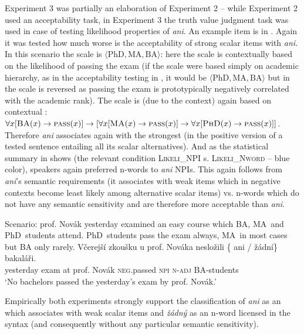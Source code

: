 \documentclass[output=paper, colorlinks, citecolor=brown, newtxmath]{langsci/langscibook}
\begin{document}
Experiment 3 was partially an elaboration of Experiment 2 -- while Experiment 2 used an acceptability task, in Experiment 3 the truth value judgment task was used in case of testing likelihood properties of \textit{ani}. An example item is in . Again it was tested how much worse is the acceptability of strong scalar items with \textit{ani}. In this scenario the scale is $\langle \text{PhD}, \text{MA}, \text{BA}\rangle$: here the scale is contextually based on the likelihood of passing the exam (if the scale were based simply on academic hierarchy, as in the acceptability testing in , it would be $\langle \text{PhD}, \text{MA}, \text{BA}\rangle$ but in  the scale is reversed as passing the exam is prototypically negatively correlated with the academic rank). The scale is (due to the context) again based on contextual : $\forall x[\textsc{BA}(x) \rightarrow  \textsc{pass}(x)] \rightarrow [\forall x[\textsc{MA}(x) \rightarrow \textsc{pass}(x)] \rightarrow \forall x[\textsc{PhD}(x) \rightarrow \textsc{pass}(x)]]$. Therefore \textit{ani} associates again with the strongest  (in the positive version of a tested sentence entailing all its scalar alternatives). And as the statistical summary in  shows (the relevant condition \textsc{Likeli\_NPI} s. \textsc{Likeli\_Nword} -- blue color), speakers again preferred n-words to \textit{ani} NPIs.  This again follows from \textit{ani}'s semantic requirements (it associates with weak items which in negative contexts become least likely among alternative scalar items)  vs. n-words which do not have any semantic sensitivity and are therefore more acceptable than \textit{ani}.

\eanoraggedright\label{ex-43} Scenario: prof. Novák yesterday examined an easy course which BA, MA~and PhD~students attend. PhD~students pass the exam always, MA~in most cases but BA only rarely.
\gll Včerejší zkoušku u prof. Nováka nesložili \{\hspace{-2pt} ani / žádní\} bakaláři.\\
yesterday exam at prof. Novák \textsc{neg}.passed {} \textsc{npi} {} \textsc{n-adj} BA-students\\
\glt `No bachelors passed the yesterday's exam by prof. Novák.'
\z


\noindent Empirically both experiments strongly support the classification of \textit{ani} as an  which associates with weak scalar items and \textit{žádný} as an n-word licensed in the syntax (and consequently without any particular semantic sensitivity).
\end{document}
